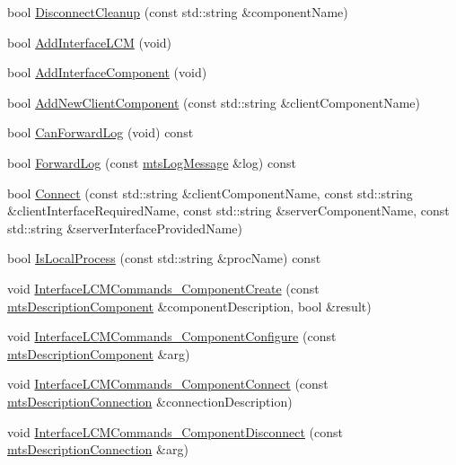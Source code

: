 \begin{DoxyCompactItemize}
\item 
bool \hyperlink{classmts_manager_component_client_a247fc2e5e3114a0968b81294d0e07efb}{Disconnect\+Cleanup} (const std\+::string \&component\+Name)
\item 
bool \hyperlink{classmts_manager_component_client_a5276a53ae1b4afeec79205cf2e642d5f}{Add\+Interface\+L\+C\+M} (void)
\item 
bool \hyperlink{classmts_manager_component_client_a655496f61e6fe26b83fa6b3aec5cbc29}{Add\+Interface\+Component} (void)
\item 
bool \hyperlink{classmts_manager_component_client_a8145aeb56a32dbfc6b8b0646054c3c82}{Add\+New\+Client\+Component} (const std\+::string \&client\+Component\+Name)
\item 
bool \hyperlink{classmts_manager_component_client_a71e559190d77acb80c5421ff3588a0d7}{Can\+Forward\+Log} (void) const 
\item 
bool \hyperlink{classmts_manager_component_client_af97b807f51afb47dded13b9bfb78163e}{Forward\+Log} (const \hyperlink{classmts_log_message}{mts\+Log\+Message} \&log) const 
\item 
bool \hyperlink{classmts_manager_component_client_a69595c3e1cac7926dc094424faab283e}{Connect} (const std\+::string \&client\+Component\+Name, const std\+::string \&client\+Interface\+Required\+Name, const std\+::string \&server\+Component\+Name, const std\+::string \&server\+Interface\+Provided\+Name)
\item 
bool \hyperlink{classmts_manager_component_client_a7b8ecbd2a06ed59f5381f55977c021da}{Is\+Local\+Process} (const std\+::string \&proc\+Name) const 
\item 
void \hyperlink{classmts_manager_component_client_a6634914815df194f57df1b51c3ecce4a}{Interface\+L\+C\+M\+Commands\+\_\+\+Component\+Create} (const \hyperlink{classmts_description_component}{mts\+Description\+Component} \&component\+Description, bool \&result)
\item 
void \hyperlink{classmts_manager_component_client_aef47087651c91c346ebedf468874fdc7}{Interface\+L\+C\+M\+Commands\+\_\+\+Component\+Configure} (const \hyperlink{classmts_description_component}{mts\+Description\+Component} \&arg)
\item 
void \hyperlink{classmts_manager_component_client_a510cba33ccd436b1ac56aeb338718c8c}{Interface\+L\+C\+M\+Commands\+\_\+\+Component\+Connect} (const \hyperlink{classmts_description_connection}{mts\+Description\+Connection} \&connection\+Description)
\item 
void \hyperlink{classmts_manager_component_client_afc1fc4c05f0bc594d9eace2499dbb98b}{Interface\+L\+C\+M\+Commands\+\_\+\+Component\+Disconnect} (const \hyperlink{classmts_description_connection}{mts\+Description\+Connection} \&arg)

\end{DoxyCompactItemize}
